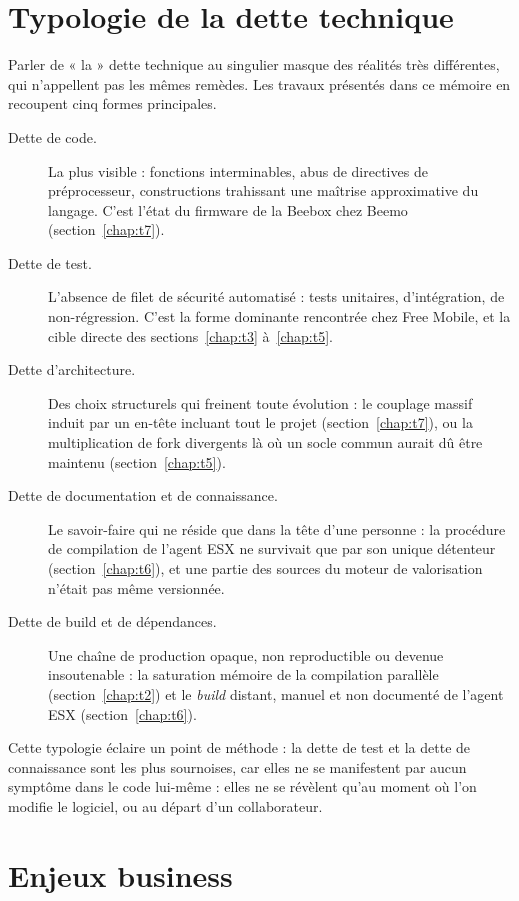 \section{Typologie de la dette technique}
Parler de « la » dette technique au singulier masque des réalités très
différentes, qui n'appellent pas les mêmes remèdes. Les travaux présentés
dans ce mémoire en recoupent cinq formes principales.

\begin{description}
  \item[Dette de code.] La plus visible : fonctions interminables, abus de
  directives de préprocesseur, constructions trahissant une maîtrise
  approximative du langage. C'est l'état du firmware de la Beebox chez Beemo
  (section~\ref{chap:t7}).
  \item[Dette de test.] L'absence de filet de sécurité automatisé : tests
  unitaires, d'intégration, de non-régression. C'est la forme dominante
  rencontrée chez Free Mobile, et la cible directe des
  sections~\ref{chap:t3} à~\ref{chap:t5}.
  \item[Dette d'architecture.] Des choix structurels qui freinent toute
  évolution : le couplage massif induit par un en-tête incluant tout le
  projet (section~\ref{chap:t7}), ou la multiplication de \gls{fork}
  divergents là où un socle commun aurait dû être maintenu
  (section~\ref{chap:t5}).
  \item[Dette de documentation et de connaissance.] Le savoir-faire qui ne
  réside que dans la tête d'une personne : la procédure de compilation de
  l'agent ESX ne survivait que par son unique détenteur
  (section~\ref{chap:t6}), et une partie des sources du moteur de
  valorisation n'était pas même versionnée.
  \item[Dette de build et de dépendances.] Une chaîne de production opaque,
  non reproductible ou devenue insoutenable : la saturation mémoire de la
  compilation parallèle (section~\ref{chap:t2}) et le \emph{build} distant,
  manuel et non documenté de l'agent ESX (section~\ref{chap:t6}).
\end{description}

Cette typologie éclaire un point de méthode : la dette de test et la dette de
connaissance sont les plus sournoises, car elles ne se manifestent par aucun
symptôme dans le code lui-même : elles ne se révèlent qu'au moment où l'on
modifie le logiciel, ou au départ d'un collaborateur.

\section{Enjeux business}

